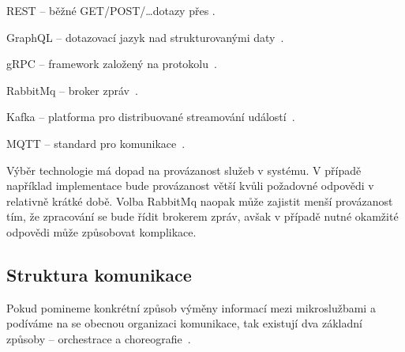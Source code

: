 \begin{dl}
   \item [REST] – běžné GET/POST/\ldots dotazy přes .
   \item [GraphQL] – dotazovací jazyk nad strukturovanými daty~\cite{graphql}.
   \item [gRPC] – framework založený na  protokolu~\cite{grpc}.
   \item [RabbitMq] – broker zpráv~\cite{rabbitmq}.
   \item [Kafka] – platforma pro distribuované streamování událostí~\cite{kafka}.
   \item [MQTT] – standard pro  komunikace~\cite{mqtt}.
\end{dl}

Výběr technologie má dopad na provázanost služeb v systému.
V případě například  implementace bude provázanost větší kvůli požadovné odpovědi v relativně krátké době.
Volba RabbitMq naopak může zajistit menší provázanost tím, že zpracování se bude řídit brokerem zpráv, avšak v případě nutné okamžité odpovědi může způsobovat komplikace.


\subsection{Struktura komunikace}\label{subsec:msa-communication-structure}

Pokud pomineme konkrétní způsob výměny informací mezi mikroslužbami a podíváme na se obecnou organizaci komunikace, tak existují dva základní způsoby – orchestrace a choreografie~\cite{choreovsorch}.


